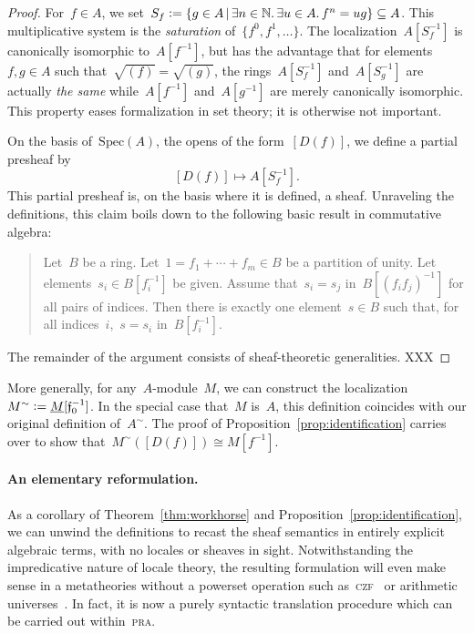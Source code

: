 \documentclass{ws-rv9x6}
\newcommand{\NN}{\mathbb{N}}
\newcommand{\fff}{\mathfrak{f}}
\newcommand{\defeq}{\vcentcolon=}
\newcommand{\Spec}{\mathrm{Spec}}
\renewcommand{\_}{\mathpunct{.}}
\newcommand{\?}{\,{:}\,}
\begin{document}
\begin{proof}For~$f \in A$, we set~$S_f \defeq \{ g \in A \,|\, \exists n \in
\NN\_ \exists u \in A\_ f^n = ug \} \subseteq A$. This multiplicative system is
the \emph{saturation} of~$\{ f^0, f^1, \ldots \}$. The localization~$A[S_f^{-1}]$
is canonically isomorphic to~$A[f^{-1}]$, but has the advantage that for
elements~$f,g \in A$ such that~$\sqrt{(f)} = \sqrt{(g)}$, the
rings~$A[S_f^{-1}]$ and~$A[S_g^{-1}]$ are actually \emph{the same}
while~$A[f^{-1}]$ and~$A[g^{-1}]$ are merely canonically isomorphic. This
property eases formalization in set theory; it is otherwise not important.

On the basis of~$\Spec(A)$, the opens of the form~$[D(f)]$, we define a partial
presheaf by
\[ [D(f)] \longmapsto A[S_f^{-1}]. \]
This partial presheaf is, on the basis where it is defined, a sheaf. Unraveling
the definitions, this claim boils down to the following basic result in
commutative algebra:
\begin{quote}
Let~$B$ be a ring. Let~$1 = f_1 + \cdots + f_m \in B$ be a partition of unity. Let
elements~$s_i \in B[f_i^{-1}]$ be given. Assume that~$s_i = s_j$
in~$B[(f_if_j)^{-1}]$ for all pairs of indices. Then there is exactly one
element~$s \in B$ such that, for all indices~$i$,~$s = s_i$ in~$B[f_i^{-1}]$.
\end{quote}
The remainder of the argument consists of sheaf-theoretic generalities.
XXX
\end{proof}

More generally, for any~$A$-module~$M$, we can construct the
localization~$M^\sim \defeq \underline{M}[\fff_0^{-1}]$. In the special case
that~$M$ is~$A$, this definition coincides with our original definition
of~$A^\sim$. The proof of Proposition~\ref{prop:identification} carries over to
show that~$M^\sim([D(f)]) \cong M[f^{-1}]$.

\paragraph{An elementary reformulation.}
As a corollary of Theorem~\ref{thm:workhorse} and
Proposition~\ref{prop:identification}, we can unwind the definitions to recast
the sheaf semantics in entirely explicit algebraic terms, with no locales or
sheaves in sight. Notwithstanding the impredicative nature of locale theory,
the resulting formulation will even make sense in a metatheories without a
powerset operation such as~\textsc{czf}~\cite{crosilla:predicativity,aczel-rathjen:cst} or arithmetic
universes~\cite{maietti:au,vickers:sketches}. In
fact, it is now a purely syntactic translation procedure which can be carried
out within~\textsc{pra}.
\end{document}
